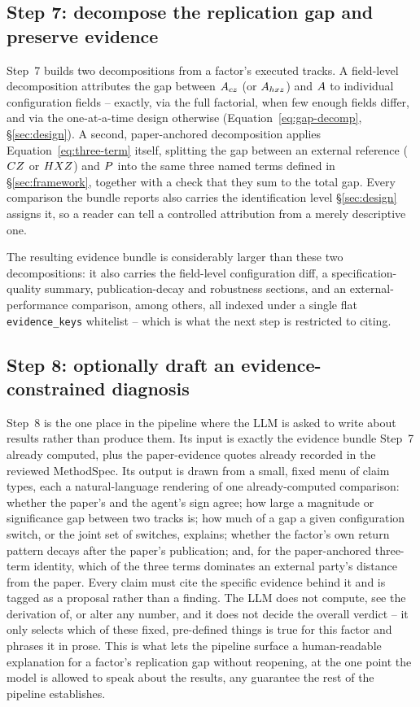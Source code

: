 \subsection{Step 7: decompose the replication gap and preserve evidence}

Step~7 builds two decompositions from a factor's executed tracks. A
field-level decomposition attributes the gap between $A_{cz}$ (or $A_{hxz}$) and
$A$ to individual configuration fields -- exactly, via the full
factorial, when few enough fields differ, and via the one-at-a-time design
otherwise (Equation~\eqref{eq:gap-decomp}, \S\ref{sec:design}). A second,
paper-anchored decomposition applies Equation~\eqref{eq:three-term} itself,
splitting the gap between an external reference ($CZ$ or $HXZ$) and
$P$ into the same three named terms defined in \S\ref{sec:framework},
together with a check that they sum to the total gap. Every comparison the
bundle reports also carries the identification level \S\ref{sec:design}
assigns it, so a reader can tell a controlled attribution from a merely
descriptive one.

The resulting evidence bundle is considerably larger than these two
decompositions: it also carries the field-level configuration diff, a
specification-quality summary, publication-decay and robustness sections,
and an external-performance comparison, among others, all indexed under a
single flat \texttt{evidence\_keys} whitelist -- which is what the next step
is restricted to citing.

\subsection{Step 8: optionally draft an evidence-constrained diagnosis}

Step~8 is the one place in the pipeline where the LLM is asked to write
about results rather than produce them. Its input is exactly the evidence
bundle Step~7 already computed, plus the paper-evidence quotes already
recorded in the reviewed MethodSpec. Its output is drawn from a small, fixed
menu of claim types, each a natural-language rendering of one already-computed
comparison: whether the paper's and the agent's sign agree; how large a
magnitude or significance gap between two tracks is; how much of a gap a
given configuration switch, or the joint set of switches, explains; whether
the factor's own return pattern decays after the paper's publication; and,
for the paper-anchored three-term identity, which of the three terms
dominates an external party's distance from the paper. Every claim must cite
the specific evidence behind it and is tagged as a proposal rather than a
finding. The LLM does not compute, see the derivation of, or alter any
number, and it does not decide the overall verdict -- it only selects which
of these fixed, pre-defined things is true for this factor and phrases it in
prose. This is what lets the pipeline surface a human-readable explanation
for a factor's replication gap without reopening, at the one point the model
is allowed to speak about the results, any guarantee the rest of the
pipeline establishes.
